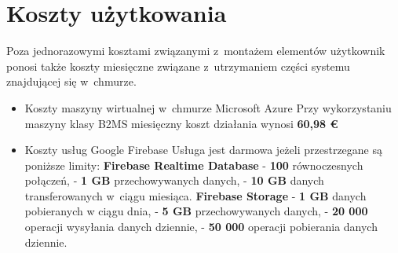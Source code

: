 \section{Koszty użytkowania}
Poza jednorazowymi kosztami związanymi z~montażem elementów użytkownik ponosi także koszty miesięczne związane z~utrzymaniem części systemu znajdującej się w~chmurze.
\begin{itemize}
    \item Koszty maszyny wirtualnej w~chmurze Microsoft Azure \newline
    Przy wykorzystaniu maszyny klasy B2MS miesięczny koszt działania wynosi \textbf{60,98 \euro}
    \item Koszty usług Google Firebase\newline
    Usługa jest darmowa jeżeli przestrzegane są poniższe limity:
    \subitem \textbf{Firebase Realtime Database}
    \subsubitem - \textbf{100} równoczesnych połączeń,
    \subsubitem - \textbf{1 GB} przechowywanych danych,
    \subsubitem - \textbf{10 GB} danych transferowanych w~ciągu miesiąca.
    \subitem \textbf{Firebase Storage}
    \subsubitem - \textbf{1 GB} danych pobieranych w ciągu dnia,
    \subsubitem - \textbf{5 GB} przechowywanych danych,
    \subsubitem - \textbf{20 000} operacji wysyłania danych dziennie,
    \subsubitem - \textbf{50 000} operacji pobierania danych dziennie.
\end{itemize}

